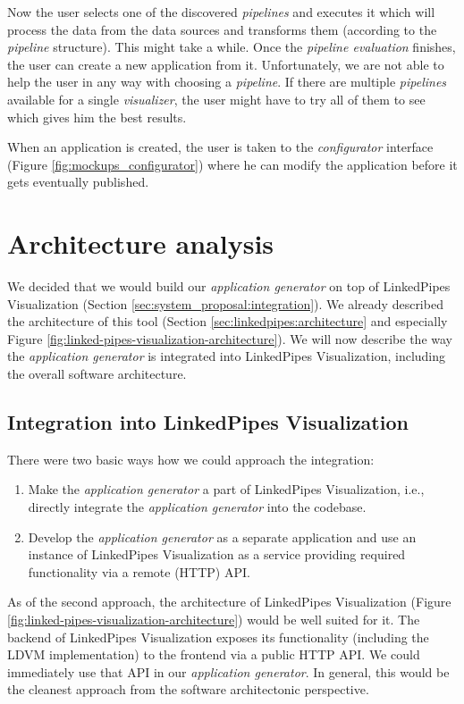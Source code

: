 Now the user selects one of the discovered \emph{pipelines} and executes it which will process the data from the data sources and transforms them (according to the \emph{pipeline} structure). This might take a while. Once the \emph{pipeline evaluation} finishes, the user can create a new application from it. Unfortunately, we are not able to help the user in any way with choosing a \emph{pipeline}. If there are multiple \emph{pipelines} available for a single \emph{visualizer}, the user might have to try all of them to see which gives him the best results.

When an application is created, the user is taken to the \emph{configurator} interface (Figure \ref{fig:mockups_configurator}) where he can modify the application before it gets eventually published.

\section{Architecture analysis}
\label{sec:system-proposal:architecture-analysis}

We decided that we would build our \emph{application generator} on top of LinkedPipes Visualization (Section \ref{sec:system_proposal:integration}). We already described the architecture of this tool (Section \ref{sec:linkedpipes:architecture} and especially Figure \ref{fig:linked-pipes-visualization-architecture}). We will now describe the way the \emph{application generator} is integrated into LinkedPipes Visualization, including the overall software architecture.

\subsection{Integration into LinkedPipes Visualization}

There were two basic ways how we could approach the integration:

\begin{enumerate}
\item Make the \emph{application generator} a part of LinkedPipes Visualization, i.e., directly integrate the \emph{application generator} into the codebase.
\item Develop the \emph{application generator} as a separate application and use an instance of LinkedPipes Visualization as a service providing required functionality via a remote (HTTP) API.
\end{enumerate}

As of the second approach, the architecture of LinkedPipes Visualization (Figure \ref{fig:linked-pipes-visualization-architecture}) would be well suited for it. The backend of LinkedPipes Visualization exposes its functionality (including the LDVM implementation) to the frontend via a public HTTP API. We could immediately use that API in our \emph{application generator}. In general, this would be the cleanest approach from the software architectonic perspective.

